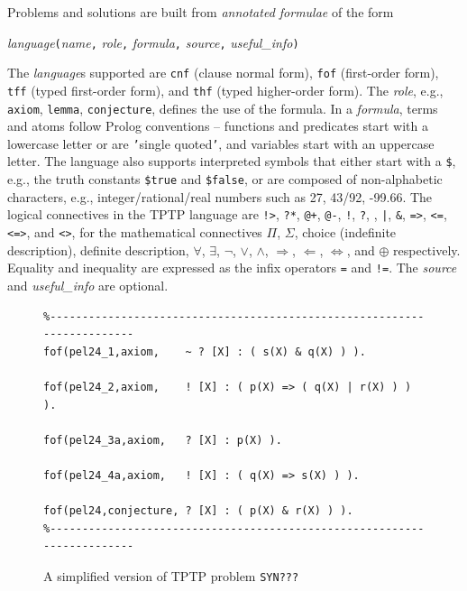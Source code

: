 \documentclass[runningheads]{llncs}
\newcommand{\smalltt}[1]{\small \texttt{#1}}
\begin{document}
Problems and solutions are built from {\em annotated formulae} of the form
\begin{center}
{\em language}{\tt (}{\em name}{\tt ,}
{\em role}{\tt ,}
{\em formula}{\tt ,}
{\em source}{\tt ,}
{\em useful\_info}{\tt )}
\end{center}
The {\em language}s supported are {\smalltt{cnf}} (clause normal form), {\smalltt{fof}}
(first-order form), {\smalltt{tff}} (typed first-order form), and {\smalltt{thf}}
(typed higher-order form).
The {\em role}, e.g., {\smalltt{axiom}}, {\smalltt{lemma}}, {\smalltt{conjecture}}, defines the 
use of the formula.
In a {\em formula}, terms and atoms follow Prolog conventions -- functions and predicates start 
with a lowercase letter or are {\tt '}single quoted{\tt '}, and variables start with an uppercase 
letter.
The language also supports interpreted symbols that either start with a {\tt \$}, e.g., the 
truth constants {\smalltt{\$true}} and {\smalltt{\$false}}, or are composed of 
non-alphabetic characters, e.g., integer/rational/real numbers such as 27, 43/92, -99.66.
The logical connectives in the TPTP language are
{\tt !>}, {\tt ?*}, {\tt @+}, {\tt @-}, {\tt !}, {\tt ?}, {\tt {\raisebox{0.4ex}{\texttildelow}}}, 
{\tt |}, {\tt \&}, {\tt =>}, {\tt <=}, {\tt <=>}, and {\tt <{\raisebox{0.4ex}{\texttildelow}}>},
for the mathematical connectives
$\Pi$, $\Sigma$, choice (indefinite description), definite description,
$\forall$, $\exists$, $\neg$, $\vee$, $\wedge$, $\Rightarrow$, $\Leftarrow$, $\Leftrightarrow$, 
and $\oplus$ respectively.
Equality and inequality are expressed as the infix operators {\tt =} and {\tt !=}.
The {\em source} and {\em useful\_info} are optional.

\begin{figure}[htb]
\centering
{\footnotesize
{\setlength{\baselineskip}{3mm}
\begin{verbatim}
%------------------------------------------------------------------------
fof(pel24_1,axiom,    ~ ? [X] : ( s(X) & q(X) ) ).

fof(pel24_2,axiom,    ! [X] : ( p(X) => ( q(X) | r(X) ) ) ).

fof(pel24_3a,axiom,   ? [X] : p(X) ).

fof(pel24_4a,axiom,   ! [X] : ( q(X) => s(X) ) ).

fof(pel24,conjecture, ? [X] : ( p(X) & r(X) ) ).
%------------------------------------------------------------------------
\end{verbatim}
}}
\caption{A simplified version of TPTP problem {\tt SYN???}}
\label{ExampleProblem}
\end{figure}
\end{document}
